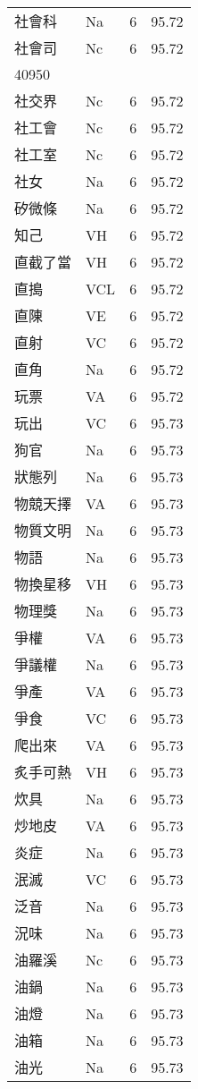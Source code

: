 \documentclass[twocolumn]{book}
\begin{document}
\begin{supertabular}{llrr}
社會科 & Na & 6 &  95.72\\
社會司 & Nc & 6 &  95.72\\
40950\\
社交界 & Nc & 6 &  95.72\\
社工會 & Nc & 6 &  95.72\\
社工室 & Nc & 6 &  95.72\\
社女 & Na & 6 &  95.72\\
矽微條 & Na & 6 &  95.72\\
知己 & VH & 6 &  95.72\\
直截了當 & VH & 6 &  95.72\\
直搗 & VCL & 6 &  95.72\\
直陳 & VE & 6 &  95.72\\
直射 & VC & 6 &  95.72\\
直角 & Na & 6 &  95.72\\
玩票 & VA & 6 &  95.72\\
玩出 & VC & 6 &  95.73\\
狗官 & Na & 6 &  95.73\\
狀態列 & Na & 6 &  95.73\\
物競天擇 & VA & 6 &  95.73\\
物質文明 & Na & 6 &  95.73\\
物語 & Na & 6 &  95.73\\
物換星移 & VH & 6 &  95.73\\
物理獎 & Na & 6 &  95.73\\
爭權 & VA & 6 &  95.73\\
爭議權 & Na & 6 &  95.73\\
爭產 & VA & 6 &  95.73\\
爭食 & VC & 6 &  95.73\\
爬出來 & VA & 6 &  95.73\\
炙手可熱 & VH & 6 &  95.73\\
炊具 & Na & 6 &  95.73\\
炒地皮 & VA & 6 &  95.73\\
炎症 & Na & 6 &  95.73\\
泯滅 & VC & 6 &  95.73\\
泛音 & Na & 6 &  95.73\\
況味 & Na & 6 &  95.73\\
油羅溪 & Nc & 6 &  95.73\\
油鍋 & Na & 6 &  95.73\\
油燈 & Na & 6 &  95.73\\
油箱 & Na & 6 &  95.73\\
油光 & Na & 6 &  95.73\\

\end{supertabular}
\end{document}
